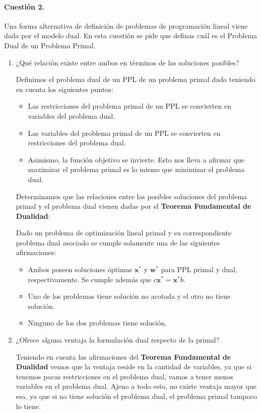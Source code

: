 \documentclass[12pt]{scrartcl}
\begin{document}
\begin{boxF}
\paragraph*{Cuestión 2.}Una forma alternativa de definición de problemas de programación lineal viene dada por el modelo dual. En esta cuestión se pide que definas cuál es el Problema Dual de un Problema Primal.
\end{boxF}

\begin{enumerate}[label=\textbf{(\alph*)}]
    \item ¿Qué relación existe entre ambos en términos de las soluciones posibles?
    
    Definimos el problema dual de un PPL de un problema primal dado teniendo en cuenta los siguientes puntos:
    \begin{itemize}
        \item Las restricciones del problema primal de un PPL se convierten en variables del problema dual.
        \item Las variables del problema primal de un PPL se convierten en restricciones del problema dual.
        \item Asimismo, la función objetivo se invierte. Esto nos lleva a afirmar que maximizar el problema primal es lo mismo que minimizar el problema dual.
    \end{itemize}
    \vspace{0.5em}
    Determinamos que las relaciones entre las posibles soluciones del problema primal y el problema dual vienen
    dadas por el \textbf{Teorema Fundamental de Dualidad}:
    \begin{boxK}
        Dado un problema de optimización lineal primal y su correspondiente problema dual asociado se cumple solamente
        una de las siguientes afirmaciones:
        \begin{itemize}
            \item Ambos poseen soluciones óptimas $\mathbf{x^*}$ y $\mathbf{w^*}$ para PPL primal y dual, respectivamente. Se cumple
            además que $c\mathbf{x^*} = \mathbf{x^*}b$.
            \item Uno de los problemas tiene solución no acotada y el otro no tiene solución.
            \item Ninguno de los dos problemas tiene solución.
        \end{itemize} 
    \end{boxK}
    \item ¿Ofrece alguna ventaja la formulación dual respecto de la primal?
    
    Teniendo en cuenta las afirmaciones del \textbf{Teorema Fundamental de Dualidad} vemos que
    la ventaja reside en la cantidad de variables, ya que si tenemos pocas restricciones en el problema dual, vamos a tener menos variables en el problema dual. Ajeno a todo esto,
    no existe ventaja mayor que esa, ya que si no tiene solución el problema dual, el problema primal tampoco lo tiene.
\end{enumerate}
\end{document}
